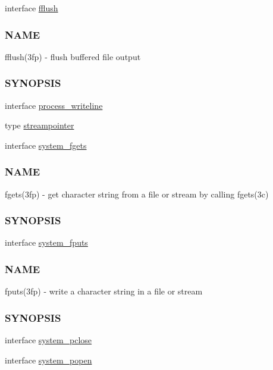 \begin{DoxyCompactItemize}
\item 
interface \hyperlink{interfacem__process_1_1fflush}{fflush}
\begin{DoxyCompactList}\small\item\em \subsubsection*{N\+A\+ME}

fflush(3fp) -\/ flush buffered file output \subsubsection*{S\+Y\+N\+O\+P\+S\+IS}\end{DoxyCompactList}\item 
interface \hyperlink{interfacem__process_1_1process__writeline}{process\+\_\+writeline}
\item 
type \hyperlink{structm__process_1_1streampointer}{streampointer}
\item 
interface \hyperlink{interfacem__process_1_1system__fgets}{system\+\_\+fgets}
\begin{DoxyCompactList}\small\item\em \subsubsection*{N\+A\+ME}

fgets(3fp) -\/ get character string from a file or stream by calling fgets(3c) \subsubsection*{S\+Y\+N\+O\+P\+S\+IS}\end{DoxyCompactList}\item 
interface \hyperlink{interfacem__process_1_1system__fputs}{system\+\_\+fputs}
\begin{DoxyCompactList}\small\item\em \subsubsection*{N\+A\+ME}

fputs(3fp) -\/ write a character string in a file or stream \subsubsection*{S\+Y\+N\+O\+P\+S\+IS}\end{DoxyCompactList}\item 
interface \hyperlink{interfacem__process_1_1system__pclose}{system\+\_\+pclose}
\item 
interface \hyperlink{interfacem__process_1_1system__popen}{system\+\_\+popen}
\end{DoxyCompactItemize}
